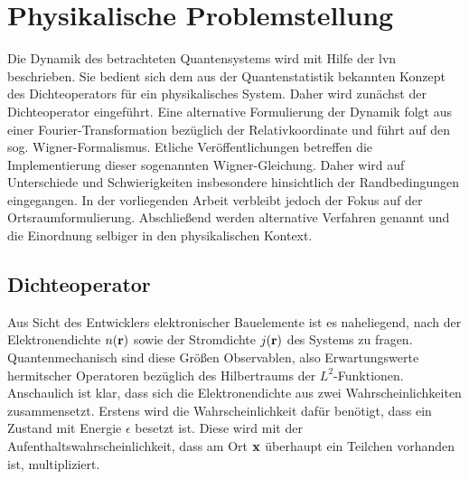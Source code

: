 \chapter{Physikalische Problemstellung}

Die Dynamik des betrachteten Quantensystems wird mit Hilfe der \ac{lvn} beschrieben. Sie bedient sich dem aus der Quantenstatistik bekannten Konzept des Dichteoperators für ein physikalisches System. Daher wird zunächst der Dichteoperator  eingeführt. Eine alternative Formulierung der Dynamik folgt aus einer Fourier-Transformation bezüglich der Relativkoordinate und führt auf den sog. Wigner-Formalismus. Etliche Veröffentlichungen betreffen die Implementierung dieser sogenannten Wigner-Gleichung. Daher wird auf Unterschiede und Schwierigkeiten insbesondere hinsichtlich der Randbedingungen eingegangen. In der vorliegenden Arbeit verbleibt jedoch der Fokus auf der Ortsraumformulierung. Abschließend werden alternative Verfahren genannt und die Einordnung selbiger in den physikalischen Kontext.

\section{Dichteoperator} 
\label{sec:2_1}
Aus Sicht des Entwicklers elektronischer Bauelemente ist es naheliegend, nach der Elektronendichte $n(\vb{r})$ sowie der Stromdichte $j(\vb{r})$ des Systems zu fragen. Quantenmechanisch sind diese Größen Observablen, also Erwartungswerte hermitscher Operatoren bezüglich des Hilbertraums der $L^2$-Funktionen. Anschaulich ist klar, dass sich die Elektronendichte aus zwei Wahrscheinlichkeiten zusammensetzt. Erstens wird die Wahrscheinlichkeit dafür benötigt, dass ein Zustand mit Energie $\epsilon$ besetzt ist. Diese wird mit der Aufenthaltswahrscheinlichkeit, dass am Ort $\vb{x}$ überhaupt ein Teilchen vorhanden ist, multipliziert.

